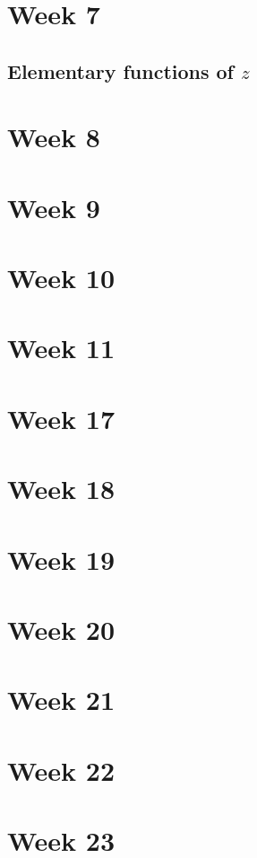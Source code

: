 \documentclass{article}
\begin{document}
\section{Week 7}
\subsection{Elementary functions of $z$}

\section{Week 8}

\section{Week 9}

\section{Week 10}

\section{Week 11}

\section{Week 17}

\section{Week 18}

\section{Week 19}

\section{Week 20}

\section{Week 21}

\section{Week 22}

\section{Week 23}
\end{document}
